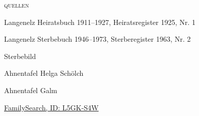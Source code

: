 \begin{person}[
    surname = {Schölch},
    givenname = {Alois Adolf},
    suffix = {1895--1963},
    label = {@I9@},
    filename = {Alois Schoelch (1895)}
    ]
\begin{itemize}
\end{itemize}
\medbreak
\textsc{{quellen}}
\begin{enumerate}[label={[\arabic*]}]
\item Langenelz Heiratsbuch 1911–1927, Heiratsregister 1925, Nr. 1
\item Langenelz Sterbebuch 1946–1973, Sterberegister 1963, Nr. 2
\item Sterbebild
\item Ahnentafel Helga Schölch
\item Ahnentafel Galm
\item \href{https://www.familysearch.org/tree/person/details/L5GK-S4W}{FamilySearch, ID: L5GK-S4W}
\end{enumerate}

\end{person}

